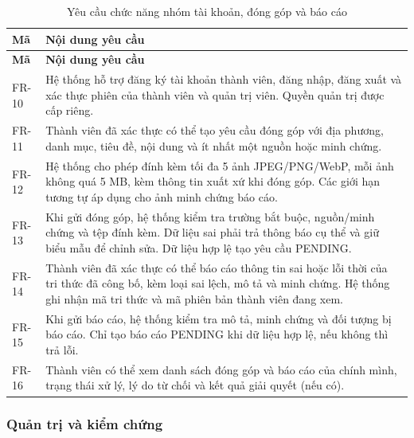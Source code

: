 \begin{longtable}{|L{20mm}|L{124mm}|}
\caption{Yêu cầu chức năng nhóm tài khoản, đóng góp và báo cáo}\label{tab:chapter3-fr-10}\\\hline
{}\textbf{Mã} & \textbf{Nội dung yêu cầu}\\\hline
\endfirsthead
\hline
{}\textbf{Mã} & \textbf{Nội dung yêu cầu}\\\hline
\endhead
\endfoot
FR-10 & Hệ thống hỗ trợ đăng ký tài khoản thành viên, đăng nhập, đăng xuất và xác thực phiên của thành viên và quản trị viên. Quyền quản trị được cấp riêng.\\\hline
FR-11 & Thành viên đã xác thực có thể tạo yêu cầu đóng góp với địa phương, danh mục, tiêu đề, nội dung và ít nhất một nguồn hoặc minh chứng.\\\hline
FR-12 & Hệ thống cho phép đính kèm tối đa 5 ảnh JPEG/PNG/WebP, mỗi ảnh không quá 5 MB, kèm thông tin xuất xứ khi đóng góp. Các giới hạn tương tự áp dụng cho ảnh minh chứng báo cáo.\\\hline
FR-13 & Khi gửi đóng góp, hệ thống kiểm tra trường bắt buộc, nguồn/minh chứng và tệp đính kèm. Dữ liệu sai phải trả thông báo cụ thể và giữ biểu mẫu để chỉnh sửa. Dữ liệu hợp lệ tạo yêu cầu PENDING.\\\hline
FR-14 & Thành viên đã xác thực có thể báo cáo thông tin sai hoặc lỗi thời của tri thức đã công bố, kèm loại sai lệch, mô tả và minh chứng. Hệ thống ghi nhận mã tri thức và mã phiên bản thành viên đang xem.\\\hline
FR-15 & Khi gửi báo cáo, hệ thống kiểm tra mô tả, minh chứng và đối tượng bị báo cáo. Chỉ tạo báo cáo PENDING khi dữ liệu hợp lệ, nếu không thì trả lỗi.\\\hline
FR-16 & Thành viên có thể xem danh sách đóng góp và báo cáo của chính mình, trạng thái xử lý, lý do từ chối và kết quả giải quyết (nếu có).\\\hline
\end{longtable}

\ReportNeedSpace{48mm}
\subsubsection{Quản trị và kiểm chứng}

